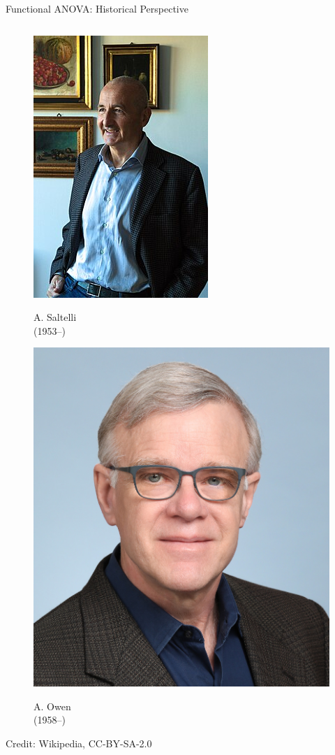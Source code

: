 \documentclass[english,aspectratio=169]{beamer}
\begin{document}
\begin{frame}[fragile]{Functional ANOVA: Historical Perspective}
\begin{columns}[T,onlytextwidth]
\begin{column}{0.40\textwidth}
\begin{figure}[ht]
\begin{minipage}[b]{0.3\linewidth}
        \includegraphics[height=.3\textheight]{./figures/saltelli}\par
        {\tiny A. Saltelli \\ (1953--)} 
      \end{minipage}%
      \begin{minipage}[b]{0.3\linewidth}
        \centering
        \includegraphics[height=.3\textheight]{./figures/owen}\par 
        {\tiny A. Owen \\ (1958--)}
      \end{minipage} 
    \end{figure}
    \vspace{-0.5em}
    {\hfill \raggedright \tiny Credit: Wikipedia, CC-BY-SA-2.0}


\end{column}
\end{columns}
\end{frame}
\end{document}
